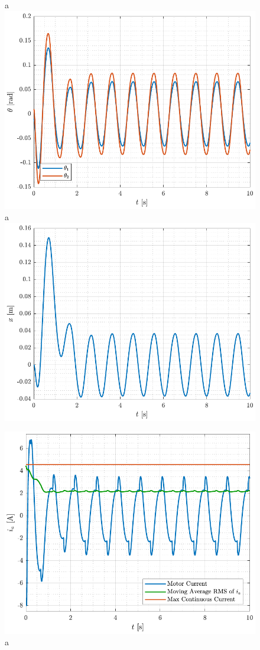 \begin{figure}[H]
  \hspace{-10pt}
  \captionbox
  {
    a
    \label{fig:theta_twinStabilize}
  }
  {
    \hspace{-1cm}
    \includegraphics[width=.4\textwidth]{figures/theta_twinStabilize}
  }
  \hspace{20pt}
  \captionbox 
  {
    a
    \label{fig:x_twinStabilize}
  }
  {
    \hspace{-1cm}
    \includegraphics[width=.4\textwidth]{figures/x_twinStabilize}
  }  
\end{figure}
%
\begin{figure}[H]
  \includegraphics[width=.5\textwidth]{figures/ia_twinStabilize}
  \caption{a}
  \label{fig:ia_twinStabilize}
\end{figure}
























